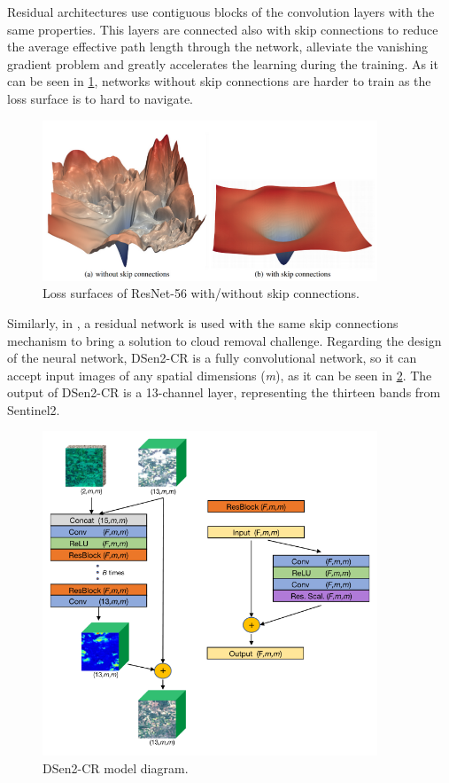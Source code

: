 \documentclass[11pt, a4paper]{article}
\begin{document}
	Residual architectures use contiguous blocks of the convolution layers with the same properties. This layers are connected also with skip connections to reduce the average effective path length through the network, alleviate the vanishing gradient problem and greatly accelerates the learning during the training.  As it can be seen in \ref{fig:related-residual-loss}, networks without skip connections are harder to train as the loss surface is to hard to navigate. \cite{NEURIPS2018_a41b3bb3}
	\begin{figure}[H]
		\centering
		\includegraphics[width=10cm]{imgs/relatedwork/resloss.png}
		\caption{Loss surfaces of ResNet-56 with/without skip connections.}
		\label{fig:related-residual-loss}
	\end{figure}
	Similarly, in \cite{Meraner2020}, a residual network is used with the same skip connections mechanism to bring a solution to cloud removal challenge.
	Regarding the design of the neural network, DSen2-CR is a fully convolutional network, so it can accept input images of any spatial dimensions (\textit{m}), as it can be seen in \ref{fig:related-dsen2-cr}.
	The  output of DSen2-CR is a 13-channel layer, representing the thirteen bands from Sentinel2.  
	\begin{figure}[H]
		\centering
		\includegraphics[width=10cm]{imgs/relatedwork/sar.png}
		\caption{DSen2-CR model diagram.}
		\label{fig:related-dsen2-cr}
	\end{figure}
\end{document}

